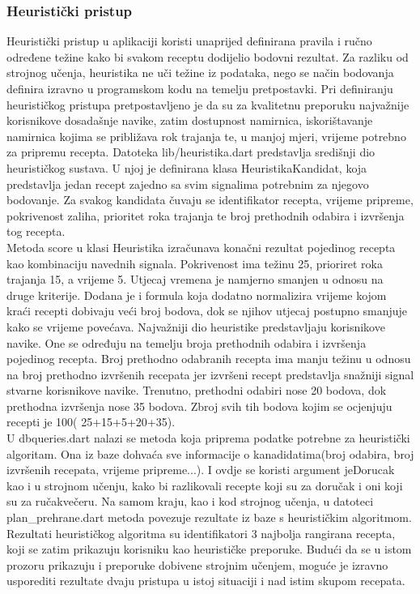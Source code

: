 \documentclass[diplomskirad]{fer}
\begin{document}
\subsubsection{Heuristički pristup}
Heuristički pristup u aplikaciji koristi unaprijed definirana pravila i ručno određene težine kako bi svakom receptu dodijelio bodovni rezultat. Za razliku od strojnog učenja, heuristika ne uči težine iz podataka, nego se način bodovanja definira izravno u programskom kodu na temelju pretpostavki. Pri definiranju heurističkog pristupa pretpostavljeno je da su za kvalitetnu preporuku najvažnije korisnikove dosadašnje navike, zatim dostupnost namirnica, iskorištavanje namirnica kojima se približava rok trajanja te, u manjoj mjeri, vrijeme potrebno za pripremu recepta. Datoteka lib/heuristika.dart predstavlja središnji dio heurističkog sustava. U njoj je definirana klasa HeuristikaKandidat, koja predstavlja jedan recept zajedno sa svim signalima potrebnim za njegovo bodovanje. Za svakog kandidata čuvaju se identifikator recepta, vrijeme pripreme, pokrivenost zaliha, prioritet roka trajanja te broj prethodnih odabira i izvršenja tog recepta. 
\\
Metoda score u klasi Heuristika izračunava konačni rezultat pojedinog recepta kao kombinaciju navednih signala. Pokrivenost ima težinu 25, prioriret roka trajanja 15, a vrijeme 5. Utjecaj vremena je namjerno smanjen u odnosu na druge kriterije. Dodana je i formula koja dodatno normalizira vrijeme kojom kraći recepti dobivaju veći broj bodova, dok se njihov utjecaj postupno smanjuje kako se vrijeme povećava. Najvažniji dio heuristike predstavljaju korisnikove navike. One se određuju na temelju broja prethodnih odabira i izvršenja pojedinog recepta. Broj prethodno odabranih recepta ima manju težinu u odnosu na broj prethodno izvršenih recepata jer izvršeni recept predstavlja snažniji signal stvarne korisnikove navike. Trenutno, prethodni odabiri nose 20 bodova, dok prethodna izvršenja nose 35 bodova. Zbroj svih tih bodova kojim se ocjenjuju recepti je 100( 25+15+5+20+35). 
\\ 
U dbqueries.dart nalazi se metoda koja priprema podatke potrebne za heuristički algoritam. Ona iz baze dohvaća sve informacije o kanadidatima(broj odabira, broj izvršenih recepata, vrijeme pripreme...). I ovdje se koristi argument jeDorucak kao i u strojnom učenju, kako bi razlikovali recepte koji su za doručak i oni koji su za ručak\/večeru. Na samom kraju, kao i kod strojnog učenja, u datoteci plan\_prehrane.dart metoda povezuje rezultate iz baze s heurističkim algoritmom. Rezultati heurističkog algoritma su identifikatori 3 najbolja rangirana recepta, koji se zatim prikazuju korisniku kao heurističke preporuke. Budući da se u istom prozoru prikazuju i preporuke dobivene strojnim učenjem, moguće je izravno usporediti rezultate dvaju pristupa u istoj situaciji i nad istim skupom recepata.
\end{document}
